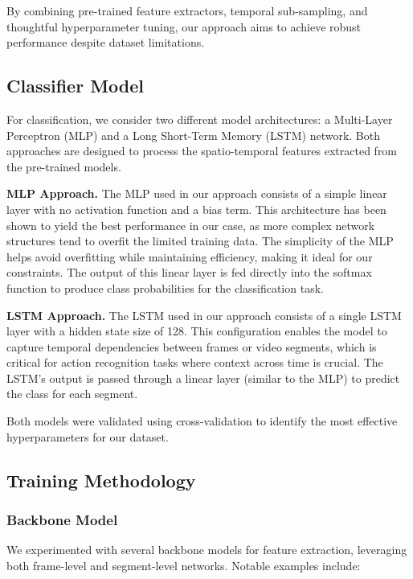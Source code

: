 By combining pre-trained feature extractors, temporal sub-sampling, and thoughtful hyperparameter tuning, our approach aims to achieve robust performance despite dataset limitations.

\subsection{Classifier Model}

For classification, we consider two different model architectures: a Multi-Layer Perceptron (MLP) and a Long Short-Term Memory (LSTM) network. Both approaches are designed to process the spatio-temporal features extracted from the pre-trained models.

\noindent\textbf{MLP Approach.} The MLP used in our approach consists of a simple linear layer with no activation function and a bias term. This architecture has been shown to yield the best performance in our case, as more complex network structures tend to overfit the limited training data. The simplicity of the MLP helps avoid overfitting while maintaining efficiency, making it ideal for our constraints. The output of this linear layer is fed directly into the softmax function to produce class probabilities for the classification task.

\noindent\textbf{LSTM Approach.} The LSTM used in our approach consists of a single LSTM layer with a hidden state size of 128. This configuration enables the model to capture temporal dependencies between frames or video segments, which is critical for action recognition tasks where context across time is crucial. The LSTM’s output is passed through a linear layer (similar to the MLP) to predict the class for each segment.

Both models were validated using cross-validation to identify the most effective hyperparameters for our dataset.


\subsection{Training Methodology}

\subsubsection*{Backbone Model}
We experimented with several backbone models for feature extraction, leveraging both frame-level and segment-level networks. Notable examples include:

